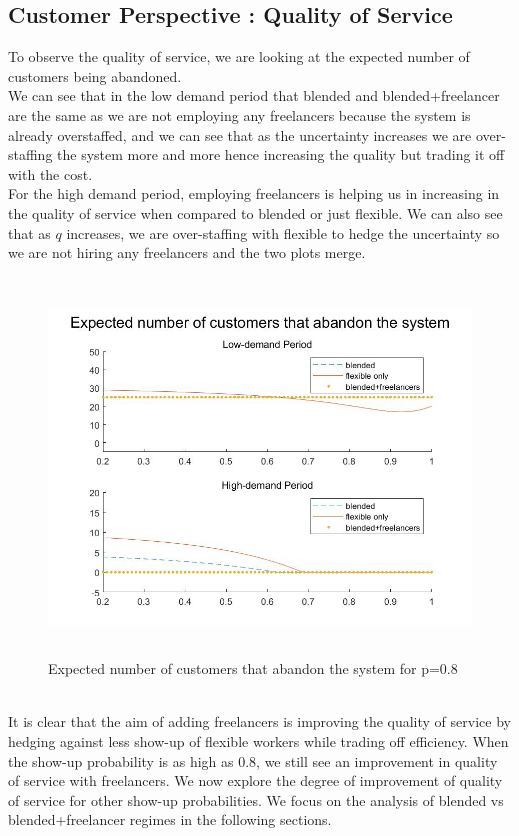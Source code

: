 \subsection{Customer Perspective : Quality of Service}
To observe the quality of service, we are looking at the expected number of customers being abandoned. 
\\We can see that in the low demand period that blended and blended+freelancer are the same as we are not employing any freelancers because the system is already overstaffed, and we can see that as the uncertainty increases we are over-staffing the system more and more hence increasing the quality but trading it off with the cost. 
\\For the high demand period, employing freelancers is helping us in increasing in the quality of service when compared to  blended or just flexible. We can also see that as $q$ increases, we are over-staffing with flexible to hedge the uncertainty so we are not hiring any freelancers and the two plots merge.
\\\begin{figure}[hbt!]
\includegraphics[height=10cm]{abandon.jpg}
\caption{Expected number of customers that abandon the system for p=0.8}
\end{figure}
\\
It is clear that the aim of adding freelancers is improving the quality of service by hedging against less show-up of flexible workers while trading off efficiency. When the show-up probability is as high as 0.8, we still see an improvement in quality of service with freelancers. We now explore the degree of improvement of quality of service for other show-up probabilities. We focus on the analysis of blended vs blended+freelancer regimes in the following sections.
